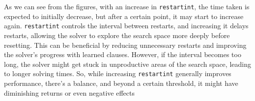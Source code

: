 \documentclass{article}
\begin{document}
    As we can see from the figures, with an increase in \texttt{restartint},
    the time taken is expected to initially decrease, but after a certain
    point, it may start to increase again. \texttt{restartint} controls the
    interval between restarts, and increasing it delays restarts, allowing the
    solver to explore the search space more deeply before resetting. This can
    be beneficial by reducing unnecessary restarts and improving the solver's
    progress with learned clauses. However, if the interval becomes too long,
    the solver might get stuck in unproductive areas of the search space,
    leading to longer solving times. So, while increasing \texttt{restartint}
    generally improves performance, there's a balance, and beyond a certain
    threshold, it might have diminishing returns or even negative effects
\end{document}
